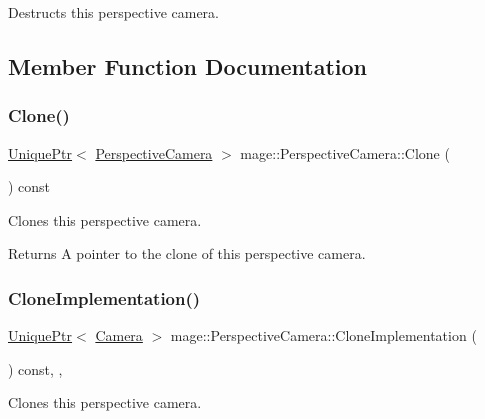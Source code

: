 Destructs this perspective camera. 

\subsection{Member Function Documentation}
\hypertarget{classmage_1_1_perspective_camera_a21545965da7ef1b6f99887bb6d2bb095}{}\label{classmage_1_1_perspective_camera_a21545965da7ef1b6f99887bb6d2bb095} 
\subsubsection{\texorpdfstring{Clone()}{Clone()}}
{\footnotesize\ttfamily \hyperlink{namespacemage_a3316d7143a973e37adf1110f2e80ca31}{Unique\+Ptr}$<$ \hyperlink{classmage_1_1_perspective_camera}{Perspective\+Camera} $>$ mage\+::\+Perspective\+Camera\+::\+Clone (\begin{DoxyParamCaption}{ }\end{DoxyParamCaption}) const}

Clones this perspective camera.

\begin{DoxyReturn}{Returns}
A pointer to the clone of this perspective camera. 
\end{DoxyReturn}
\hypertarget{classmage_1_1_perspective_camera_aa597ab884256b7e6fad63653af3ac789}{}\label{classmage_1_1_perspective_camera_aa597ab884256b7e6fad63653af3ac789} 
\subsubsection{\texorpdfstring{Clone\+Implementation()}{CloneImplementation()}}
{\footnotesize\ttfamily \hyperlink{namespacemage_a3316d7143a973e37adf1110f2e80ca31}{Unique\+Ptr}$<$ \hyperlink{classmage_1_1_camera}{Camera} $>$ mage\+::\+Perspective\+Camera\+::\+Clone\+Implementation (\begin{DoxyParamCaption}{ }\end{DoxyParamCaption}) const\hspace{0.3cm}{\ttfamily [override]}, {\ttfamily [private]}, {\ttfamily [virtual]}}

Clones this perspective camera.

